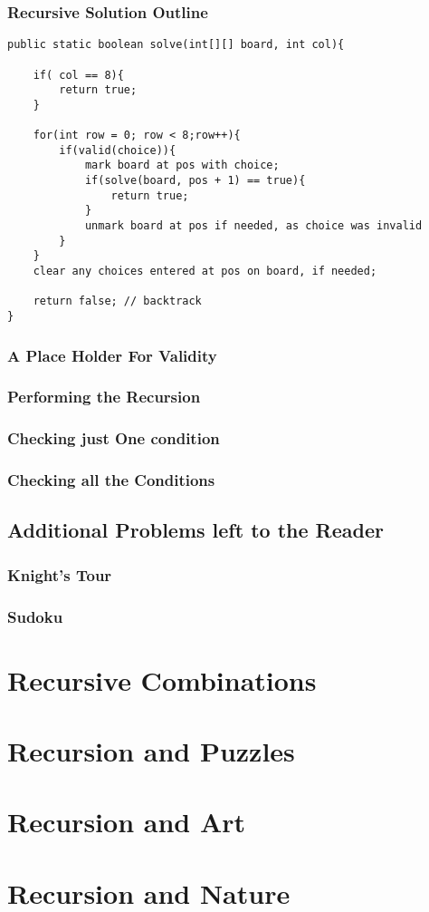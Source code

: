 \subsubsection{Recursive Solution Outline}
\begin{verbatim}
public static boolean solve(int[][] board, int col){
	
	if( col == 8){
		return true;
	}
	
	for(int row = 0; row < 8;row++){
		if(valid(choice)){
			mark board at pos with choice;
			if(solve(board, pos + 1) == true){
				return true;
			}
			unmark board at pos if needed, as choice was invalid
		}
	}
	clear any choices entered at pos on board, if needed;
	
	return false; // backtrack
}

\end{verbatim}

\subsubsection{A Place Holder For Validity}

\subsubsection{Performing the Recursion}

\subsubsection{Checking just One condition}


\subsubsection{Checking all the Conditions}




\subsection{Additional Problems left to the Reader}

\subsubsection{Knight's Tour}

\subsubsection{Sudoku}




\section{Recursive Combinations}



\section{Recursion and Puzzles}



\section{Recursion and Art}

\section{Recursion and Nature}
